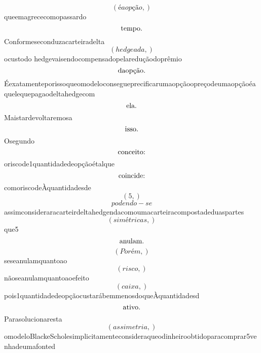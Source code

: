 \documentclass{article}
\begin{document}
\begin{equation}
\left( éaopção,\right)
\end{equation}queemagrececomopassardo\begin{equation}
$tempo.$
\end{equation}Conformeseconduzacarteiradelta\begin{equation}
\left( hedgeada,\right)
\end{equation}ocustodo hedgevaisendocompensadopelareduçãodoprêmio\begin{equation}
$daopção.$
\end{equation}Éexatamenteporissoqueomodeloconsegueprecificarumaopçãoopreçodeumaopçãoéaquelequepagaodeltahedgecom\begin{equation}
$ela.$
\end{equation}Maistardevoltaremosa\begin{equation}
$isso.$
\end{equation}Osegundo\begin{equation}
$conceito:$
\end{equation}oriscode1quantidadedeopçãoétalque\begin{equation}
$coincide:$
\end{equation}comoriscodeÀquantidadesde\begin{equation}
\left( 5,\right)
\end{equation}\begin{equation}
podendo - se
\end{equation}assimconsideraracarteirdeltahedgendacomoumacarteiracompostadeduaspartes\begin{equation}
\left( simétricas,\right)
\end{equation}que5\begin{equation}
$anulam.$
\end{equation}\begin{equation}
\left( Porém,\right)
\end{equation}seseanulamquantoao\begin{equation}
\left( risco,\right)
\end{equation}nãoseanulamquantoaoefeito\begin{equation}
\left( caixa,\right)
\end{equation}pois1quantidadedeopçãocustarábemmenosdoqueÀquantidadesd\begin{equation}
$ativo.$
\end{equation}Parasolucionaresta\begin{equation}
\left( assimetria,\right)
\end{equation}omodeloBlackeScholesimplicitamenteconsideraqueodinheiroobtidoparacomprar5venhadeumafonted\begin{equation}

\end{equation}
\end{document}

